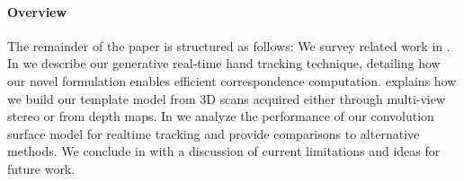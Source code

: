 %

\paragraph{Overview}
The remainder of the paper is structured as follows: We survey related work in . In  we describe our generative real-time hand tracking technique, detailing how our novel formulation enables efficient correspondence computation.
% 
 explains how we build our template model from 3D scans acquired either through multi-view stereo or from depth maps.
% 
In  we analyze the performance of our convolution surface model for realtime tracking and provide comparisons to alternative methods. 
% 
We conclude in  with a discussion of current limitations and ideas for future work.
 




